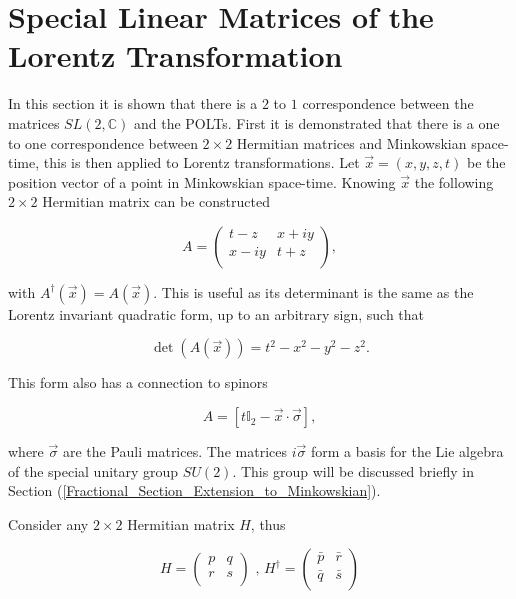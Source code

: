 \section{Special Linear Matrices of the Lorentz Transformation}\label{Special_Linear_Matrices_of_Lorentz}

In this section it is shown that there is a $2$ to $1$ correspondence between the matrices $SL(2, \mathbb{C})$ and the POLTs. First it is demonstrated that there is a one to one correspondence between $2 \times 2$ Hermitian matrices and Minkowskian space-time, this is then applied to Lorentz transformations. Let $\vec{x} = (x,y,z,t)$ be the position vector of a point in Minkowskian space-time. Knowing $\vec{x}$ the following $2 \times 2$ Hermitian matrix can be constructed \cite[p. 9-10]{Hypersurfaces_Hogan_Barrabes}

\begin{equation}\label{Special_Matrices_A_first}
A = 
\left( 
\begin{array}{cc}
t-z    & x + i y \\
x - iy & t+z \\
\end{array} 
\right),
\end{equation}

\noindent with $A^{\dagger}(\vec{x}) = A(\vec{x})$. This is useful as its determinant is the same as the Lorentz invariant quadratic form, up to an arbitrary sign, such that

\begin{equation*}
\det(A(\vec{x})) = t^2 - x^2 - y^2 - z^2.
\end{equation*}

\noindent This form also has a connection to spinors 

\begin{equation*}
A = [t\mathbb{I}_{2} - \vec{x} \cdot \vec{\sigma}],
\end{equation*}  

\noindent where $\vec{\sigma}$ are the Pauli matrices. The matrices $i\vec{\sigma}$ form a basis for the Lie algebra of the special unitary group $SU(2)$. This group will be discussed briefly in Section (\ref{Fractional_Section_Extension_to_Minkowskian}). 

Consider any $2 \times 2$ Hermitian matrix $H$, thus

\begin{equation*}
H = \left( \begin{array}{cc}
p & q \\
r & s \\
\end{array} \right) \text{ ,     }
H^{\dagger} = \left( \begin{array}{cc}
\bar{p} & \bar{r} \\
\bar{q} & \bar{s} \\
\end{array} \right)
\end{equation*}

